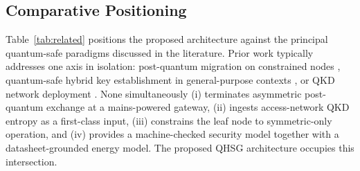 \documentclass[journal]{IEEEtran}
\begin{document}
\subsection{Comparative Positioning}
\label{sec:related_positioning}
Table~\ref{tab:related} positions the proposed architecture against the principal quantum-safe
paradigms discussed in the literature. Prior work typically addresses one axis in isolation:
post-quantum migration on constrained nodes \cite{kannwischer2020pqm4,alkim2016kyber}, quantum-safe
hybrid key establishment in general-purpose contexts \cite{campagna2020quantum,ietfhybrid}, or
QKD network deployment \cite{cao2022quantum,frohlich2013quantum}. None simultaneously (i) terminates
asymmetric post-quantum exchange at a mains-powered gateway, (ii) ingests access-network QKD entropy
as a first-class input, (iii) constrains the leaf node to symmetric-only operation, and
(iv) provides a machine-checked security model together with a datasheet-grounded energy model.
The proposed QHSG architecture occupies this intersection.

\begin{table}[htbp]
\centering
\caption{Comparative positioning of quantum-safe residential IoT paradigms.}
\label{tab:related}
\small
{}
\end{table}

\end{document}
